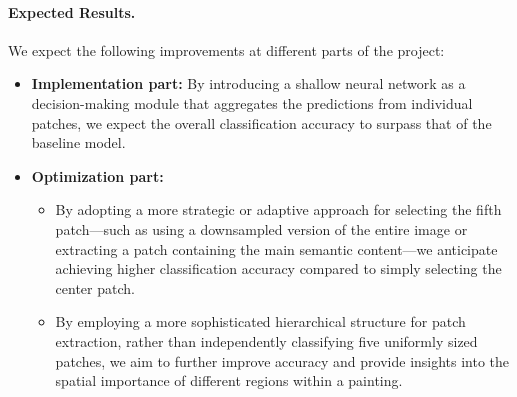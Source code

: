 \paragraph{Expected Results.}
We expect the following improvements at different parts of the project: \begin{itemize} \item \textbf{Implementation part:} By introducing a shallow neural network as a decision-making module that aggregates the predictions from individual patches, we expect the overall classification accuracy to surpass that of the baseline model. \item \textbf{Optimization part:} \begin{itemize} \item By adopting a more strategic or adaptive approach for selecting the fifth
                    patch—such as using a downsampled version of the entire image or extracting a
                    patch containing the main semantic content—we anticipate achieving higher
                    classification accuracy compared to simply selecting the center patch. \item By employing a more sophisticated hierarchical structure for patch extraction,
                    rather than independently classifying five uniformly sized patches, we aim to
                    further improve accuracy and provide insights into the spatial importance of
                    different regions within a painting. \end{itemize} \end{itemize}